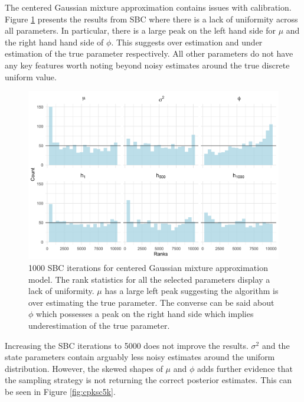 \documentclass[12pt, a4paper]{article}
\begin{document}
    The centered Gaussian mixture approximation contains issues with calibration. Figure \ref{fig:cpksc1k} presents the results from SBC where there is a lack of uniformity across all parameters. In particular, there is a large peak on the left hand side for $\mu$ and the right hand hand side of $\phi$. This suggests over estimation and under estimation of the true parameter respectively. All other parameters do not have any key features worth noting beyond noisy estimates around the true discrete uniform value. 

    \begin{figure}[H]
        \centering
        \includegraphics[scale=0.1]{results/ksc_cp_1k.png}
        \caption{1000 SBC iterations for centered Gaussian mixture approximation model. The rank statistics for all the selected parameters display a lack of uniformity. $\mu$ has a large left peak suggesting the algorithm is over estimating the true parameter. The converse can be said about $\phi$ which possesses a peak on the right hand side which implies underestimation of the true parameter.}
        \label{fig:cpksc1k}
    \end{figure}

    Increasing the SBC iterations to 5000 does not improve the results. $\sigma^2$ and the state parameters contain arguably less noisy estimates around the uniform distribution. However, the skewed shapes of $\mu$ and $\phi$ adds further evidence that the sampling strategy is not returning the correct posterior estimates. This can be seen in Figure \ref{fig:cpksc5k}.
\end{document}
